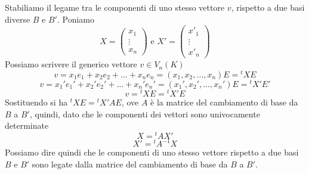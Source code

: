 \documentclass{report}
\begin{document}
Stabiliamo il legame tra le componenti di uno stesso vettore \(v\), rispetto a due basi diverse \(B\) e \(B'\). Poniamo \[
X = \begin{pmatrix} x_1\\ \vdots\\ x_n \end{pmatrix} \text{ e } X'=\begin{pmatrix} x'_1\\ \vdots\\ x'_n \end{pmatrix}
\] Possiamo scrivere il generico vettore \(v \in V_n(K)\) \[
v = x_1e_1+x_2e_2 + \ldots + x_n e_n = (x_1,x_2, \ldots , x_n)E= {^{t}X}E \] \[
v = x_1'e_1'+x_2'e_2' + \ldots + x_n' e_n' = (x_1',x_2', \ldots , x_n')E= {^{t}X'}E'
\] \[
v = {^{t}X}E = {^{t}X'}E
\] Sostituendo si ha \({^{t}X}E = {^tX'}AE\), ove \(A\) è la matrice del cambiamento di base da \(B\) a \(B'\), quindi, dato che le componenti dei vettori sono univocamente determinate \[
X = {^tA}X'
\] \[
X' = {^tA^{-1}}X
\] Possiamo dire quindi che le componenti di uno stesso vettore rispetto a due basi \(B\) e \(B'\) sono legate dalla matrice del cambiamento di base da \(B\) a \(B'\).
\end{document}
